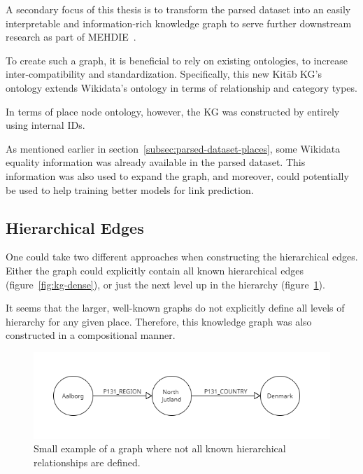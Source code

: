 A secondary focus of this thesis is to transform the parsed dataset into an easily interpretable and information-rich
knowledge graph to serve further downstream research as part of MEHDIE~\cite{MEHDIE}.

To create such a graph, it is beneficial to rely on existing ontologies, to increase inter-compatibility and standardization.
Specifically, this new Kitāb KG's ontology extends Wikidata's ontology in terms of relationship and category types.

In terms of place node ontology, however, the KG was constructed by entirely using internal IDs.

As mentioned earlier in section~\ref{subsec:parsed-dataset-places}, some Wikidata equality information was already available in the parsed dataset.
This information was also used to expand the graph, and moreover, could potentially be used to help training better models for link prediction.

\subsection{Hierarchical Edges}
One could take two different approaches when constructing the hierarchical edges.
Either the graph could explicitly contain all known hierarchical edges (figure~\ref{fig:kg-dense}),
or just the next level up in the hierarchy (figure~\ref{fig:kg-comp}).

It seems that the larger, well-known graphs do not explicitly define all levels of hierarchy for any given place.
Therefore, this knowledge graph was also constructed in a compositional manner.

\begin{figure}[h] %
    \centering %
    \includegraphics[width=0.9\linewidth]{figures/kg-comp} %
    \caption{Small example of a graph where not all known hierarchical relationships are defined.} %
    \label{fig:kg-comp} %
\end{figure}

